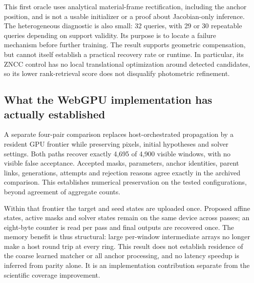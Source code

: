 This first oracle uses analytical material-frame rectification, including the anchor position, and is not a usable initializer or a proof about Jacobian-only inference. The heterogeneous diagnostic is also small: 32 queries, with 29 or 30 repeatable queries depending on support validity. Its purpose is to locate a failure mechanism before further training. The result supports geometric compensation, but cannot itself establish a practical recovery rate or runtime. In particular, its ZNCC control has no local translational optimization around detected candidates, so its lower rank-retrieval score does not disqualify photometric refinement.

\subsection{What the WebGPU implementation has actually established}
A separate four-pair comparison replaces host-orchestrated propagation by a resident GPU frontier while preserving pixels, initial hypotheses and solver settings. Both paths recover exactly 4,695 of 4,900 visible windows, with no visible false acceptance. Accepted masks, parameters, anchor identities, parent links, generations, attempts and rejection reasons agree exactly in the archived comparison. This establishes numerical preservation on the tested configurations, beyond agreement of aggregate counts.

Within that frontier the target and seed states are uploaded once. Proposed affine states, active masks and solver states remain on the same device across passes; an eight-byte counter is read per pass and final outputs are recovered once. The memory benefit is thus structural: large per-window intermediate arrays no longer make a host round trip at every ring. This result does not establish residence of the coarse learned matcher or all anchor processing, and no latency speedup is inferred from parity alone. It is an implementation contribution separate from the scientific coverage improvement.
